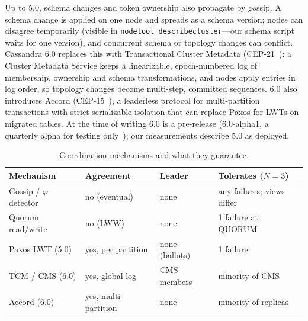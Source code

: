 Up to 5.0, schema changes and token ownership also propagate by gossip. A schema change is
applied on one node and spreads as a schema version; nodes can disagree temporarily
(visible in \texttt{nodetool describecluster}---our schema script waits for one version), and
concurrent schema or topology changes can conflict. Cassandra 6.0 replaces this with
Transactional Cluster Metadata (CEP-21~\cite{cep21}): a Cluster Metadata Service keeps a
linearizable, epoch-numbered log of membership, ownership and schema transformations, and
nodes apply entries in log order, so topology changes become multi-step, committed sequences.
6.0 also introduces Accord (CEP-15~\cite{cep15,accord2021}), a leaderless protocol for
multi-partition transactions with strict-serializable isolation that can replace Paxos for
LWTs on migrated tables. At the time of writing 6.0 is a pre-release (6.0-alpha1, a
quarterly alpha for testing only~\cite{cass6alpha}); our measurements describe 5.0 as deployed.

\begin{table}[t]\centering\footnotesize
\setlength{\tabcolsep}{3pt}\caption{Coordination mechanisms and what they guarantee.}\label{tab:coordination}
\begin{tabular}{@{}p{}p{}p{}p{}@{}}\hline
Mechanism & Agreement & Leader & Tolerates ($N=3$) \\ \hline
Gossip / $\varphi$ detector & no (eventual) & none & any failures; views differ \\
Quorum read/write & no (LWW) & none & 1 failure at QUORUM \\
Paxos LWT (5.0) & yes, per partition & none (ballots) & 1 failure \\
TCM / CMS (6.0) & yes, global log & CMS members & minority of CMS \\
Accord (6.0) & yes, multi-partition & none & minority of replicas \\ \hline
\end{tabular}
\end{table}
